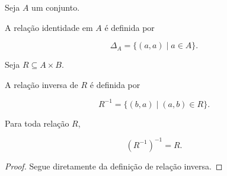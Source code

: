 \documentclass[../../main]{subfiles}
\begin{document}
\begin{defn}
	\label{def:matematica:relacoes:relacoes-binarias:identidade}

	Seja \(A\) um conjunto.

	A relação identidade em \(A\) é definida por

	\[
		\Delta_A
		=
		\{
		(a,a)
		\mid
		a\in A
		\}.
	\]

\end{defn}

\begin{defn}
	\label{def:matematica:relacoes:relacoes-binarias:inversa}

	Seja \(R\subseteq A\times B\).

	A relação inversa de \(R\) é definida por

	\[
		R^{-1}
		=
		\{
		(b,a)
		\mid
		(a,b)\in R
		\}.
	\]

\end{defn}

\begin{prop}
	\label{prop:matematica:relacoes:relacoes-binarias:inversa-inversa}

	Para toda relação \(R\),

	\[
		(R^{-1})^{-1}
		=
		R.
	\]

\end{prop}

\begin{proof}

	Segue diretamente da definição de relação inversa.

\end{proof}
\end{document}
